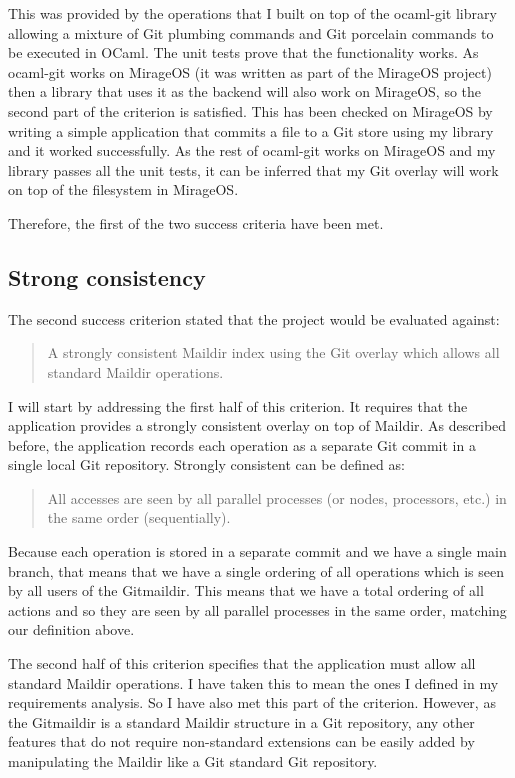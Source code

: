 This was provided by the operations that I built on top of the ocaml-git library allowing a mixture of Git plumbing commands and Git porcelain commands to be executed in OCaml. The unit tests prove that the functionality works. As ocaml-git works on MirageOS (it was written as part of the MirageOS project) then a library that uses it as the backend will also work on MirageOS, so the second part of the criterion is satisfied. This has been checked on MirageOS by writing a simple application that commits a file to a Git store using my library and it worked successfully. As the rest of ocaml-git works on MirageOS and my library passes all the unit tests, it can be inferred that my Git overlay will work on top of the filesystem in MirageOS.

Therefore, the first of the two success criteria have been met.

\subsection{Strong consistency}

The second success criterion stated that the project would be evaluated against:

\begin{quote}
  A strongly consistent Maildir index using the Git overlay which allows all standard Maildir operations.
\end{quote}

I will start by addressing the first half of this criterion. It requires that the application provides a strongly consistent overlay on top of Maildir. As described before, the application records each operation as a separate Git commit in a single local Git repository. Strongly consistent can be defined as:
\begin{quote}
  All accesses are seen by all parallel processes (or nodes, processors, etc.) in the same order (sequentially).
\end{quote}
Because each operation is stored in a separate commit and we have a single main branch, that means that we have a single ordering of all operations which is seen by all users of the Gitmaildir. This means that we have a total ordering of all actions and so they are seen by all parallel processes in the same order, matching our definition above.

The second half of this criterion specifies that the application must allow all standard Maildir operations. I have taken this to mean the ones I defined in my requirements analysis. So I have also met this part of the criterion. However, as the Gitmaildir is a standard Maildir structure in a Git repository, any other features that do not require non-standard extensions can be easily added by manipulating the Maildir like a Git standard Git repository.

